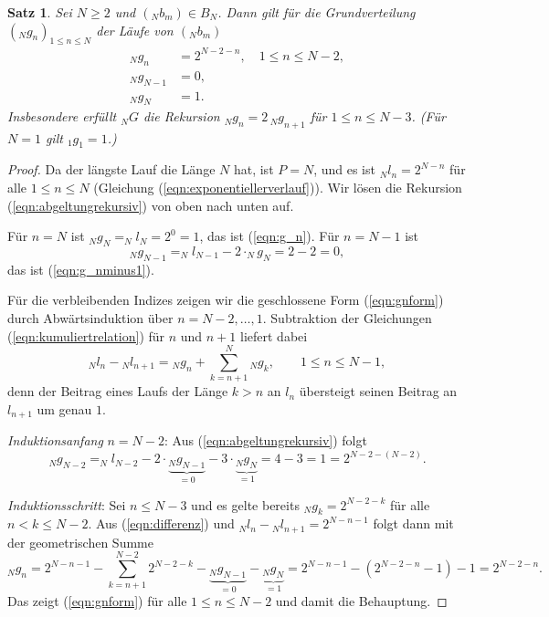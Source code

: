 \documentclass[11pt,a4paper]{scrartcl}
\theoremstyle{plain}
\newtheorem{satz}{Satz}
\theoremstyle{definition}
\theoremstyle{remark}
\begin{document}
\begin{satz}\label{satz:grundverteilung}
Sei $N\geq 2$ und $(_Nb_m)\in B_N$. Dann gilt für die Grundverteilung
$(_Ng_n)_{1\leq n\leq N}$ der Läufe von $(_Nb_m)$
\begin{align}
  _Ng_n&=2^{N-2-n},\quad 1\leq n\leq N-2,\label{eqn:gnform}\\
  _Ng_{N-1}&=0,\label{eqn:g_nminus1}\\
  _Ng_N&=1.\label{eqn:g_n}
\end{align}
Insbesondere erfüllt $_NG$ die Rekursion $_Ng_n=2\,{_Ng}_{n+1}$ für
$1\leq n\leq N-3$. (Für $N=1$ gilt $_1g_1=1$.)
\end{satz}

\begin{proof}
Da der längste Lauf die Länge $N$ hat, ist $P=N$, und es ist
$_Nl_n=2^{N-n}$ für alle $1\leq n\leq N$
(Gleichung (\ref{eqn:exponentiellerverlauf})). Wir lösen die Rekursion
(\ref{eqn:abgeltungrekursiv}) von oben nach unten auf.

Für $n=N$ ist $_Ng_N=_Nl_N=2^{0}=1$, das ist (\ref{eqn:g_n}).
Für $n=N-1$ ist
\begin{equation*}
  _Ng_{N-1}=_Nl_{N-1}-2\cdot _Ng_N=2-2=0,
\end{equation*}
das ist (\ref{eqn:g_nminus1}).

Für die verbleibenden Indizes zeigen wir die geschlossene Form
(\ref{eqn:gnform}) durch Abwärtsinduktion über $n=N-2,\dots,1$.
Subtraktion der Gleichungen (\ref{eqn:kumuliertrelation}) für $n$ und
$n+1$ liefert dabei
\begin{equation}\label{eqn:differenz}
  {}_Nl_n-{}_Nl_{n+1}= {}_Ng_n+\sum_{k=n+1}^{N} {}_Ng_k,\qquad 1\leq n\leq N-1,
\end{equation}
denn der Beitrag eines Laufs der Länge $k>n$ an $l_n$ übersteigt seinen
Beitrag an $l_{n+1}$ um genau $1$.

\emph{Induktionsanfang} $n=N-2$: Aus (\ref{eqn:abgeltungrekursiv})
folgt
\begin{equation*}
  _Ng_{N-2}=_Nl_{N-2}-2\cdot\underbrace{_Ng_{N-1}}_{=0}
  -3\cdot\underbrace{_Ng_N}_{=1}
  =4-3=1=2^{N-2-(N-2)}.
\end{equation*}

\emph{Induktionsschritt}: Sei $n\leq N-3$ und es gelte bereits
$_Ng_k=2^{N-2-k}$ für alle $n<k\leq N-2$. Aus (\ref{eqn:differenz}) und
${}_Nl_n-{}_Nl_{n+1}=2^{N-n-1}$ folgt dann mit der geometrischen Summe
\begin{equation*}
  _Ng_n
  =2^{N-n-1}-\sum_{k=n+1}^{N-2}2^{N-2-k}
  -\underbrace{_Ng_{N-1}}_{=0}-\underbrace{_Ng_N}_{=1}
  =2^{N-n-1}-\left(2^{N-2-n}-1\right)-1
  =2^{N-2-n}.
\end{equation*}
Das zeigt (\ref{eqn:gnform}) für alle $1\leq n\leq N-2$ und damit die
Behauptung.
\end{proof}
\end{document}
